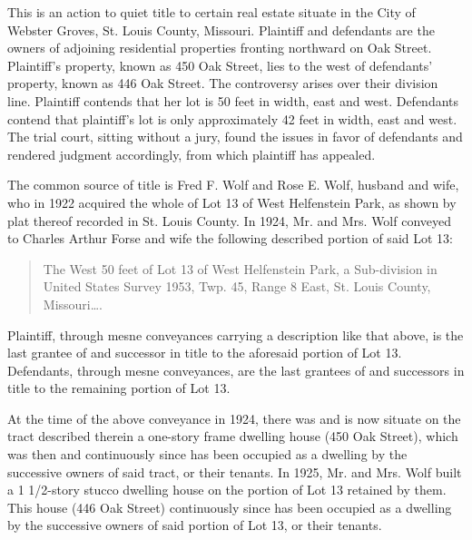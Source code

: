
This is an action to quiet title to certain real estate situate in the City of
Webster Groves, St. Louis County, Missouri. Plaintiff and defendants are the
owners of adjoining residential properties fronting northward on Oak Street.
Plaintiff's property, known as 450 Oak Street, lies to the west of defendants'
property, known as 446 Oak Street. The controversy arises over their division
line. Plaintiff contends that her lot is 50 feet in width, east and west.
Defendants contend that plaintiff's lot is only approximately 42 feet in width,
east and west. The trial court, sitting without a jury, found the issues in
favor of defendants and rendered judgment accordingly, from which plaintiff has
appealed.


The common source of title is Fred F. Wolf and Rose E. Wolf, husband and wife,
who in 1922 acquired the whole of Lot 13 of West Helfenstein Park, as shown by
plat thereof recorded in St. Louis County. In 1924, Mr. and Mrs. Wolf conveyed
to Charles Arthur Forse and wife the following described portion of said Lot
13: 
\begin{quote}
The West 50 feet of Lot 13 of West Helfenstein Park, a Sub-division in United
States Survey 1953, Twp. 45, Range 8 East, St. Louis County, Missouri\ldots.
\end{quote}
Plaintiff, through mesne conveyances carrying a description like that above, is
the last grantee of and successor in title to the aforesaid portion of Lot 13.
Defendants, through mesne conveyances, are the last grantees of and successors
in title to the remaining portion of Lot 13. 

At the time of the above conveyance in 1924, there was and is now situate on the
tract described therein a one-story frame dwelling house (450 Oak Street),
which was then and continuously since has been occupied as a dwelling by the
successive owners of said tract, or their tenants. In 1925, Mr. and Mrs. Wolf
built a 1 1/2-story stucco dwelling house on the portion of Lot 13 retained by
them. This house (446 Oak Street) continuously since has been occupied as a
dwelling by the successive owners of said portion of Lot 13, or their tenants. 

